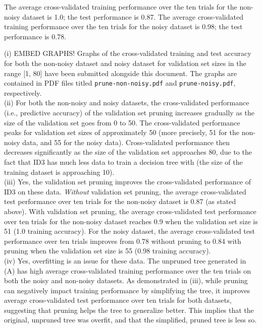 \documentclass[solution, letterpaper]{cs121}
\begin{document}
\subproblem The average cross-validated training performance over the ten trials for the non-noisy dataset is 1.0; the test performance is 0.87. The average cross-validated training performance over the ten trials for the noisy dataset is 0.98; the test performance is 0.78.
\pagebreak
\subproblem
 
(i) EMBED GRAPHS! Graphs of the cross-validated training and test accuracy for both the non-noisy dataset and noisy dataset for validation set sizes in the range [1, 80] have been submitted alongside this document. The graphs are contained in PDF files titled {\tt prune-non-noisy.pdf} and {\tt prune-noisy.pdf}, respectively. \\

(ii) For both the non-noisy and noisy datasets, the cross-validated performance (i.e., predictive accuracy) of the validation set pruning increases gradually as the size of the validation set goes from 0 to 50. The cross-validated performance peaks for validation set sizes of approximately 50 (more precisely, 51 for the non-noisy data, and 55 for the noisy data). Cross-validated performance then decreases significantly as the size of the validation set approaches 80, due to the fact that ID3 has much less data to train a decision tree with (the size of the training dataset is approaching 10). \\

(iii) Yes, the validation set pruning improves the cross-validated performance of ID3 on these data. \emph{Without} validation set pruning, the average cross-validated test performance over ten trials for the non-noisy dataset is 0.87 (as stated above). With validation set pruning, the average cross-validated test performance over ten trials for the non-noisy dataset reaches 0.9 when the validation set size is 51 (1.0 training accuracy). For the noisy dataset, the average cross-validated test performance over ten trials improves from 0.78 without pruning to 0.84 with pruning when the validation set size is 55 (0.98 training accuracy). \\

(iv) Yes, overfitting is an issue for these data. The unpruned tree generated in (A) has high average cross-validated training performance over the ten trials on both the noisy and non-noisy datasets. As demonstrated in (iii), while pruning can negatively impact training performance by simplifying the tree, it improves average cross-validated test performance over ten trials for both datasets, suggesting that pruning helps the tree to generalize better. This implies that the original, unpruned tree was overfit, and that the simplified, pruned tree is less so.
\end{document}
